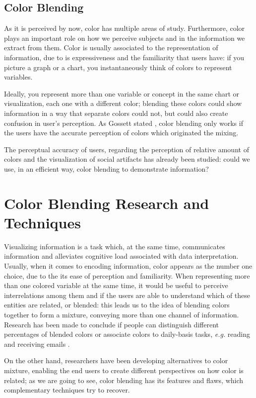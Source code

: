 \documentclass{report}
\begin{document}
\subsection{Color Blending}
As it is perceived by now, color has multiple areas of study. Furthermore, color plays an important role
on how we perceive subjects and in the information we extract from them. Color is usually associated to
the representation of information, due to is expressiveness and the familiarity that users have: if you
picture a graph or a chart, you instantaneously think of colors to represent variables. \par
Ideally, you represent more than one variable or concept in the same chart or visualization, each one
with a different color; blending these colors could show information in a way that separate colors could
not, but could also create confusion in user’s perception. As Gossett stated \cite{Gossett2004}, color blending only
works if the users have the accurate perception of colors which originated the mixing. \par
The perceptual accuracy of users, regarding the perception of relative amount of colors and the visualization
of social artifacts has already been studied: could we use, in an efficient way, color blending to demonstrate
information?
%
\section{Color Blending Research and Techniques}
Visualizing information is a task which, at the same time, communicates information and alleviates
cognitive load associated with data interpretation. Usually, when it comes to encoding information, color
appears as the number one choice, due to the its ease of perception and familiarity. When representing
more than one colored variable at the same time, it would be useful to perceive interrelations among
them and if the users are able to understand which of these entities are related, or blended: this leads
us to the idea of blending colors together to form a mixture, conveying more than one channel of information.
Research has been made to conclude if people can distinguish different percentages of blended colors or
associate colors to daily-basis tasks, \emph{e.g.} reading and receiving emails \cite{Gama20143}. \par
On the other hand, researchers have been developing alternatives to color mixture, enabling the end users
to create different perspectives on how color is related; as we are going to see, color blending has its
features and flaws, which complementary techniques try to recover. \par
%
\end{document}
